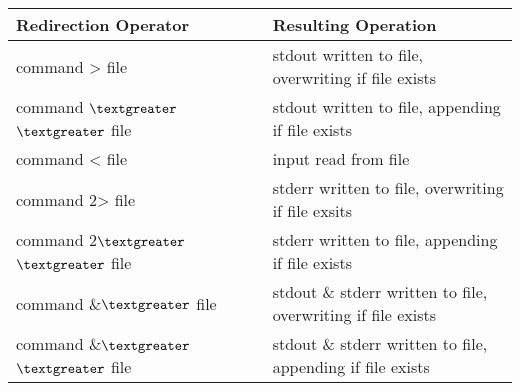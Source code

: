 \setlength{\columnsep}{3pt}
\begin{flushleft}
	
	\begin{tabulary}{1.0\textwidth}{|p{10em}|p{18em}|}
		\toprule
		\textbf{Redirection Operator} & \textbf{Resulting Operation}\\
		\midrule
		command > file & stdout written to file, overwriting if file exists \\
		\hline
		command {$\textgreater$}{$\textgreater$} file & stdout written to file, appending if file exists \\
		\hline
		command < file & input read from file \\
		\hline
		command 2> file & stderr written to file, overwriting if file exsits \\
		\hline
		command 2{$\textgreater$}{$\textgreater$} file & stderr written to file, appending if file exists \\
		\hline
		command \&{$\textgreater$} file & stdout \& stderr written to file, overwriting if file exists \\
		\hline
		command \&{$\textgreater$}{$\textgreater$} file & stdout \& stderr written to file, appending if file exists \\
		\bottomrule
	\end{tabulary}
	
\end{flushleft}

\newpage

